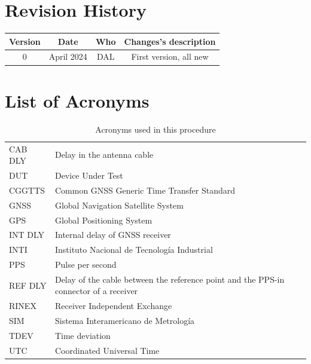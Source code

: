 \documentclass[11pt]{article}
\begin{document}
\maketitle

\addtocounter{page}{-1}
\thispagestyle{empty}


\newpage
\tableofcontents


\newpage
\section*{Revision History}

\begin{table}[h]
    \centering
    \begin{tabular}{|c|c|c|c|}
        \hline
        Version & Date & Who & Changes's description\\
        \hline
        0 & April 2024 & DAL  & First version, all new\\
        \hline
    \end{tabular}
\end{table}

\newpage
\section*{List of Acronyms}

\begin{table}[ht]
\centering
\begin{tabular}[t]{ll}
\hline
CAB DLY & Delay in the antenna cable\\
DUT & Device Under Test\\
CGGTTS &  Common GNSS Generic Time Transfer Standard \\
GNSS & Global Navigation Satellite System\\
GPS & Global Positioning System\\
INT DLY & Internal delay of GNSS receiver\\ 
INTI & Instituto Nacional de Tecnolog\'ia Industrial\\
PPS & Pulse per second \\
REF DLY & Delay of the cable between the reference point and the PPS-in connector of a receiver\\
RINEX & Receiver Independent Exchange \\
SIM & Sistema Interamericano de Metrolog\'ia\\
TDEV & Time deviation\\
UTC & Coordinated Universal Time\\
\hline
\end{tabular}
\caption{Acronyms used in this procedure}
\end{table}%
\end{document}
